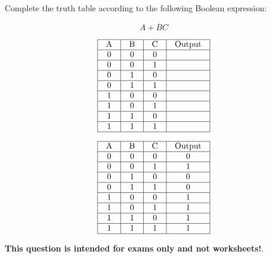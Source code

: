 

Complete the truth table according to the following Boolean expression:

$$A + \overline{B}C$$


$$\vbox{\offinterlineskip
\halign{\strut
\vrule \quad\hfil # \ \hfil & 
\vrule \quad\hfil # \ \hfil & 
\vrule \quad\hfil # \ \hfil & 
\vrule \quad\hfil # \ \hfil \vrule \cr
\noalign{\hrule}
%
A & B & C & Output \cr
%
\noalign{\hrule}
%
0 & 0 & 0 & \cr
%
\noalign{\hrule}
%
0 & 0 & 1 &  \cr
%
\noalign{\hrule}
%
0 & 1 & 0 &  \cr
%
\noalign{\hrule}
%
0 & 1 & 1 &  \cr
%
\noalign{\hrule}
%
1 & 0 & 0 &  \cr
%
\noalign{\hrule}
%
1 & 0 & 1 &  \cr
%
\noalign{\hrule}
%
1 & 1 & 0 &  \cr
%
\noalign{\hrule}
%
1 & 1 & 1 &  \cr
%
\noalign{\hrule}
} %
}$$ %








$$\vbox{\offinterlineskip
\halign{\strut
\vrule \quad\hfil # \ \hfil & 
\vrule \quad\hfil # \ \hfil & 
\vrule \quad\hfil # \ \hfil & 
\vrule \quad\hfil # \ \hfil \vrule \cr
\noalign{\hrule}
%
A & B & C & Output \cr
%
\noalign{\hrule}
%
0 & 0 & 0 & 0 \cr
%
\noalign{\hrule}
%
0 & 0 & 1 & 1 \cr
%
\noalign{\hrule}
%
0 & 1 & 0 & 0 \cr
%
\noalign{\hrule}
%
0 & 1 & 1 & 0 \cr
%
\noalign{\hrule}
%
1 & 0 & 0 & 1 \cr
%
\noalign{\hrule}
%
1 & 0 & 1 & 1 \cr
%
\noalign{\hrule}
%
1 & 1 & 0 & 1 \cr
%
\noalign{\hrule}
%
1 & 1 & 1 & 1 \cr
%
\noalign{\hrule}
} %
}$$ %







{\bf This question is intended for exams only and not worksheets!}.




